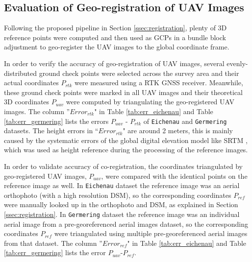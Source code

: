 \subsection{Evaluation of Geo-registration of UAV Images}
\label{ssec:georegistration}
Following the proposed pipeline in Section \ref{ssec:registration}, plenty of 3D reference points were computed and then used as GCPs in a bundle block adjustment to geo-register the UAV images to the global coordinate frame.

In order to verify the accuracy of geo-registration of UAV images, several evenly-distributed ground check points were selected across the survey area and their actual coordinates $P_{rtk}$ were measured using a RTK GNSS receiver. Meanwhile, these ground check points were marked in all UAV images and their theoretical 3D coordinates $P_{uav}$ were computed by triangulating the geo-registered UAV images. 
The column ''$Error_{rtk}$" in Table \ref{tab:err_eichenau} and Table \ref{tab:err_germering} lists the errors $P_{uav}$ - $P_{rtk}$ of \texttt{Eichenau} and \texttt{Germering} datasets. 
The height errors in ``$Error_{rtk}$" are around 2 meters, this is mainly caused by the systematic errors of the global digital elevation model like SRTM \cite{Rabus2003241}, which was used as height reference during the processing of the reference images. 

In order to validate accuracy of co-registration, the coordinates triangulated by geo-registered UAV images, $P_{uav}$, were compared with the identical points on the reference image as well.
In \texttt{Eichenau} dataset the reference image was an aerial orthophoto (with a high resolution DSM), so the corresponding coordinates $P_{ref}$ were manually looked up in the orthophoto and DSM, as explained in Section \ref{ssec:registration}.
In \texttt{Germering} dataset the reference image was an individual aerial image from a pre-georeferenced aerial images dataset, so the corresponding coordinates $P_{ref}$ were triangulated using multiple pre-georeferenced aerial images from that dataset.  
The column ''$Error_{ref}$" in Table \ref{tab:err_eichenau} and Table \ref{tab:err_germering} lists the error $P_{uav}$-$P_{ref}$. 



